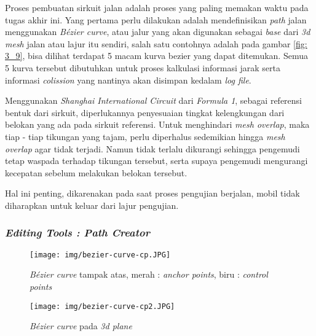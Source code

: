 	Proses pembuatan sirkuit jalan adalah proses yang paling memakan waktu pada tugas akhir ini. Yang pertama perlu dilakukan adalah mendefinisikan \textit{path} jalan menggunakan \textit{Bézier curve}, atau jalur yang akan digunakan sebagai \textit{base} dari \textit{3d mesh} jalan atau lajur itu sendiri, salah satu contohnya adalah pada gambar \ref{fig: 3_9}, bisa dilihat terdapat 5 macam kurva bezier yang dapat ditemukan. Semua 5 kurva tersebut dibutuhkan untuk proses kalkulasi informasi jarak serta informasi \textit{colission} yang nantinya akan disimpan kedalam \textit{log file}.
	\par Menggunakan \textit{Shanghai International Circuit} dari \textit{Formula 1}, sebagai referensi bentuk dari sirkuit, diperlukannya penyesuaian tingkat kelengkungan dari belokan yang ada pada sirkuit referensi. Untuk menghindari \textit{mesh overlap}, maka tiap - tiap tikungan yang tajam, perlu diperhalus sedemikian hingga \textit{mesh overlap} agar tidak terjadi. Namun tidak terlalu dikurangi sehingga pengemudi tetap waspada terhadap tikungan tersebut, serta supaya pengemudi mengurangi kecepatan sebelum melakukan belokan tersebut.
	\par Hal ini penting, dikarenakan pada saat proses pengujian berjalan, mobil tidak diharapkan untuk keluar dari lajur pengujian.
	    
	    \subsubsection{\textit{Editing Tools : Path Creator}}
	    \vspace{1ex}
	    
	    \begin{figure} [!htb]
	        \captionsetup{justification=centering}
	        \texttt{[image: img/bezier-curve-cp.JPG]}
	        \caption{\textit{Bézier curve} tampak atas, merah : \textit{anchor points}, biru : \textit{control points}}
	        \label{fig: 3_11}
        \end{figure}
        
        \begin{figure} [!htb]
	        \captionsetup{justification=centering}
	        \texttt{[image: img/bezier-curve-cp2.JPG]}
	        \caption{\textit{Bézier curve} pada \textit{3d plane}}
	        \label{fig: 3_12}
        \end{figure}
	    
